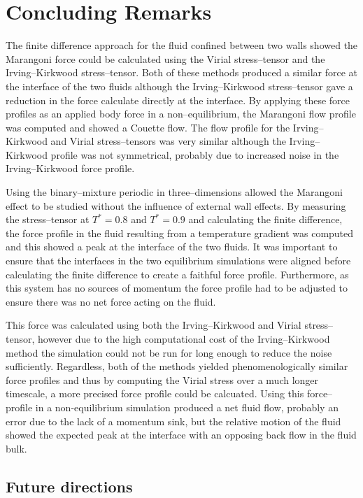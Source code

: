 \section{Concluding Remarks}
The finite difference approach for the fluid confined between two walls showed the Marangoni force could be calculated using the Virial stress--tensor and the Irving--Kirkwood stress--tensor.
Both of these methods produced a similar force at the interface of the two fluids although the Irving--Kirkwood stress--tensor gave a reduction in the force calculate directly at the interface.
By applying these force profiles as an applied body force in a non--equilibrium, the Marangoni flow profile was computed and showed a Couette flow.
The flow profile for the Irving--Kirkwood and Virial stress--tensors was very similar although the Irving--Kirkwood profile was not symmetrical, probably due to increased noise in the Irving--Kirkwood force profile.

Using the binary--mixture periodic in three--dimensions allowed the Marangoni effect to be studied without the influence of external wall effects.
By measuring the stress--tensor at $T^{*}=0.8$ and $T^{*}=0.9$ and calculating the finite difference, the force profile in the fluid resulting from a temperature gradient was computed and this showed a peak at the interface of the two fluids.
It was important to ensure that the interfaces in the two equilibrium simulations were aligned before calculating the finite difference to create a faithful force profile.
Furthermore, as this system has no sources of momentum the force profile had to be adjusted to ensure there was no net force acting on the fluid.

This force was calculated using both the Irving--Kirkwood and Virial stress--tensor, however due to the high computational cost of the Irving--Kirkwood method the simulation could not be run for long enough to reduce the noise sufficiently.
Regardless, both of the methods yielded phenomenologically similar force profiles and thus by computing the Virial stress over a much longer timescale, a more precised force profile could be calcuated.
Using this force--profile in a non-equilibrium simulation produced a net fluid flow, probably an error due to the lack of a momentum sink, but the relative motion of the fluid showed the expected peak at the interface with an opposing back flow in the fluid bulk.

\subsection{Future directions}
